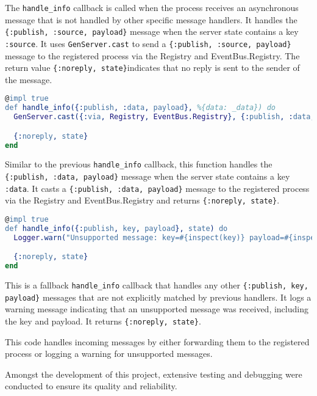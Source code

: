 The \texttt{handle\_info} callback is called when the process receives an asynchronous message that is not handled by other specific message handlers. It handles the \texttt{\{:publish, :source, payload\}} message when the server state contains a key \texttt{:source}. It uses \texttt{GenServer.cast} to send a \texttt{\{:publish, :source, payload\}} message to the registered process via the Registry and EventBus.Registry. The return value \texttt{\{:noreply, state\}}indicates that no reply is sent to the sender of the message.\newline

\begin{lstlisting}[language=erlang, caption={Handle\_info for :data on extractor.ex}]
@impl true
def handle_info({:publish, :data, payload}, %{data: _data}) do
  GenServer.cast({:via, Registry, EventBus.Registry}, {:publish, :data, payload})

  {:noreply, state}
end
\end{lstlisting}

Similar to the previous \texttt{handle\_info} callback, this function handles the \texttt{\{:publish, :data, payload\}} message when the server state contains a key \texttt{:data}. It casts a \texttt{\{:publish, :data, payload\}} message to the registered process via the Registry and EventBus.Registry and returns \texttt{\{:noreply, state\}}.\newline

\begin{lstlisting}[language=erlang, caption={Handle\_info for key on extractor.ex}]
@impl true
def handle_info({:publish, key, payload}, state) do
  Logger.warn("Unsupported message: key=#{inspect(key)} payload=#{inspect(payload)}")

  {:noreply, state}
end
\end{lstlisting}

This is a fallback \texttt{handle\_info} callback that handles any other \texttt{\{:publish, key, payload\}} messages that are not explicitly matched by previous handlers. It logs a warning message indicating that an unsupported message was received, including the key and payload. It returns \texttt{\{:noreply, state\}}.\newline

This code handles incoming messages by either forwarding them to the registered process or logging a warning for unsupported messages.\newline

Amongst the development of this project, extensive testing and debugging were conducted to ensure its quality and reliability.\newline

